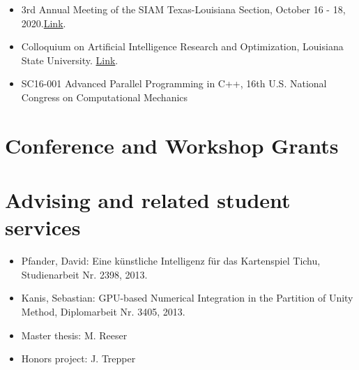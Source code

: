 \documentclass[11pt,a4paper,sans]{moderncv}
\begin{document}
\begin{itemize}[leftmargin=4cm]
\item 3rd Annual Meeting of the SIAM Texas-Louisiana Section, October 16 - 18, 2020.\href{https://www.math.tamu.edu/conferences/SIAMTXLA/}{Link}.
\end{itemize}

\begin{itemize}[leftmargin=4cm]
\item Colloquium on Artificial Intelligence Research and Optimization, Louisiana State University. \href{https://stellar-group.org/research/distributed-machine-learning/}{Link}.
\end{itemize}

\begin{itemize}[leftmargin=4cm]
\item SC16-001 Advanced Parallel Programming in C++, 16th U.S. National Congress on Computational Mechanics
\end{itemize}

\section{Conference and Workshop Grants}

\section{Advising and related student services}
\begin{itemize}[leftmargin=4cm]
\item Pfander, David: Eine künstliche Intelligenz für das Kartenspiel Tichu, Studienarbeit Nr. 2398, 2013.
\item Kanis, Sebastian: GPU-based Numerical Integration in the Partition of Unity Method, Diplomarbeit Nr. 3405, 2013.
\end{itemize}

\begin{itemize}[leftmargin=4cm]
\item Master thesis: M. Reeser
\item Honors project: J. Trepper
\end{itemize}
\end{document}
